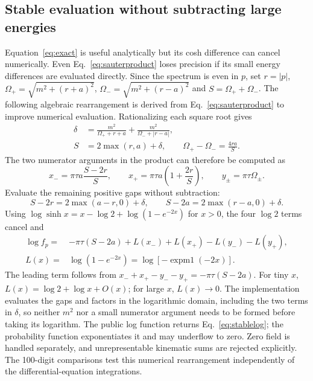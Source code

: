 \documentclass[11pt,a4paper]{article}
\begin{document}
\subsection{Stable evaluation without subtracting large energies}
Equation~\eqref{eq:exact} is useful analytically but its cosh difference can cancel numerically. Even Eq.~\eqref{eq:sauterproduct} loses precision if its small energy differences are evaluated directly. Since the spectrum is even in $p$, set $r=|p|$, $\Omega_+=\sqrt{m^2+(r+a)^2}$, $\Omega_-=\sqrt{m^2+(r-a)^2}$ and $S=\Omega_++\Omega_-$. The following algebraic rearrangement is derived from Eq.~\eqref{eq:sauterproduct} to improve numerical evaluation. Rationalizing each square root gives
\begin{align}
 \delta&=\frac{m^2}{\Omega_++r+a}+\frac{m^2}{\Omega_-+|r-a|},\nonumber\\
 S&=2\max(r,a)+\delta,\qquad
 \Omega_+-\Omega_-=\frac{4ra}{S}.\label{eq:rationalized}
\end{align}
The two numerator arguments in the product can therefore be computed as
\begin{equation}
 x_- =\pi\tau a\frac{S-2r}{S},\qquad
 x_+ =\pi\tau a\left(1+\frac{2r}{S}\right),\qquad
 y_\pm=\pi\tau\Omega_\pm.
\end{equation}
Evaluate the remaining positive gaps without subtraction:
\begin{equation}
 S-2r=2\max(a-r,0)+\delta,\qquad
 S-2a=2\max(r-a,0)+\delta.
\end{equation}
Using $\log\sinh x=x-\log2+\log(1-e^{-2x})$ for $x>0$, the four $\log2$ terms cancel and
\begin{align}
 \log f_p={}&-\pi\tau(S-2a)+L(x_-)+L(x_+)-L(y_-)-L(y_+),\nonumber\\
 L(x)={}&\log(1-e^{-2x})=\log[-\operatorname{expm1}(-2x)].
 \label{eq:stablelog}
\end{align}
The leading term follows from $x_-+x_+-y_--y_+=-\pi\tau(S-2a)$. For tiny $x$, $L(x)=\log2+\log x+O(x)$; for large $x$, $L(x)\to0$. The implementation evaluates the gaps and factors in the logarithmic domain, including the two terms in $\delta$, so neither $m^2$ nor a small numerator argument needs to be formed before taking its logarithm. The public log function returns Eq.~\eqref{eq:stablelog}; the probability function exponentiates it and may underflow to zero. Zero field is handled separately, and unrepresentable kinematic sums are rejected explicitly. The 100-digit comparisons test this numerical rearrangement independently of the differential-equation integrations.
\end{document}
